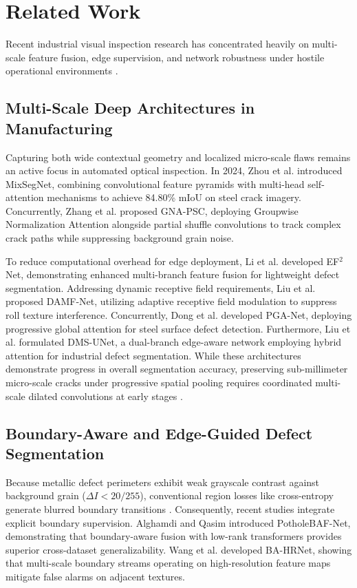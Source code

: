 \documentclass{ieeeaccess}
\begin{document}
\section{Related Work}
\label{sec:literature_review}
Recent industrial visual inspection research has concentrated heavily on multi-scale feature fusion, edge supervision, and network robustness under hostile operational environments \cite{survey2020, song2013neu}.

\subsection{Multi-Scale Deep Architectures in Manufacturing}
Capturing both wide contextual geometry and localized micro-scale flaws remains an active focus in automated optical inspection. In 2024, Zhou et al. \cite{zhou2024mixsegnet} introduced MixSegNet, combining convolutional feature pyramids with multi-head self-attention mechanisms to achieve 84.80\% mIoU on steel crack imagery. Concurrently, Zhang et al. \cite{zhang2024gnapsc} proposed GNA-PSC, deploying Groupwise Normalization Attention alongside partial shuffle convolutions to track complex crack paths while suppressing background grain noise.

To reduce computational overhead for edge deployment, Li et al. \cite{li2024ef2net} developed EF$^2$Net, demonstrating enhanced multi-branch feature fusion for lightweight defect segmentation. Addressing dynamic receptive field requirements, Liu et al. \cite{liu2024damfnet} proposed DAMF-Net, utilizing adaptive receptive field modulation to suppress roll texture interference. Concurrently, Dong et al. \cite{dong2023pganet} developed PGA-Net, deploying progressive global attention for steel surface defect detection. Furthermore, Liu et al. \cite{liu2024dmsunet} formulated DMS-UNet, a dual-branch edge-aware network employing hybrid attention for industrial defect segmentation. While these architectures demonstrate progress in overall segmentation accuracy, preserving sub-millimeter micro-scale cracks under progressive spatial pooling requires coordinated multi-scale dilated convolutions at early stages \cite{chen2018deeplabv3plus}.

\subsection{Boundary-Aware and Edge-Guided Defect Segmentation}
Because metallic defect perimeters exhibit weak grayscale contrast against background grain ($\Delta I < 20/255$), conventional region losses like cross-entropy generate blurred boundary transitions \cite{krassnig2025ispad, alghamdi2024potholebaf}. Consequently, recent studies integrate explicit boundary supervision. Alghamdi and Qasim \cite{alghamdi2024potholebaf} introduced PotholeBAF-Net, demonstrating that boundary-aware fusion with low-rank transformers provides superior cross-dataset generalizability. Wang et al. \cite{wang2025bahrnet} developed BA-HRNet, showing that multi-scale boundary streams operating on high-resolution feature maps mitigate false alarms on adjacent textures.
\end{document}
